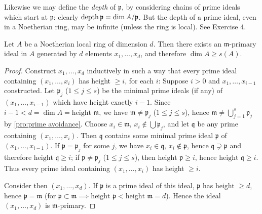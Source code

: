 \begin{remark}
Likewise we may define the \emph{depth} of $\mathfrak{p}$, by considering chains of prime ideals which start at $\mathfrak{p}$: clearly $\operatorname{depth} \mathfrak{p} = \dim A/\mathfrak{p}$. But the depth of a prime ideal, even in a Noetherian ring, may be infinite (unless the ring is local). See Exercise 4.
\end{remark}

\begin{proposition}\label{prop:dim-leq-s}
Let $A$ be a Noetherian local ring of dimension $d$. Then there exists an $\mathfrak{m}$-primary ideal in $A$ generated by $d$ elements $x_1, \ldots, x_d$, and therefore $\dim A \geq s(A)$.
\end{proposition}

\begin{proof}
Construct $x_1, \ldots, x_d$ inductively in such a way that every prime ideal containing $(x_1, \ldots, x_i)$ has height $\geq i$, for each $i$: Suppose $i > 0$ and $x_1, \ldots, x_{i-1}$ constructed. Let $\mathfrak{p}_j$ ($1 \leq j \leq s$) be the minimal prime ideals (if any) of $(x_1, \ldots, x_{i-1})$ which have height exactly $i - 1$. Since $i - 1 < d = \dim A = \text{height } \mathfrak{m}$, we have $\mathfrak{m} \neq \mathfrak{p}_j$ ($1 \leq j \leq s$), hence $\mathfrak{m} \neq \bigcup_{j=1}^s \mathfrak{p}_j$ by \eqref{pro:prime avoidance}. Choose $x_i \in \mathfrak{m}$, $x_i \notin \bigcup \mathfrak{p}_j$, and let $\mathfrak{q}$ be any prime containing $(x_1, \ldots, x_i)$. Then $\mathfrak{q}$ contains some minimal prime ideal $\mathfrak{p}$ of $(x_1, \ldots, x_{i-1})$. If $\mathfrak{p} = \mathfrak{p}_j$ for some $j$, we have $x_i \in \mathfrak{q}$, $x_i \notin \mathfrak{p}$, hence $\mathfrak{q} \supsetneq \mathfrak{p}$ and therefore $\text{height } \mathfrak{q} \geq i$; if $\mathfrak{p} \neq \mathfrak{p}_j$ ($1 \leq j \leq s$), then $\text{height } \mathfrak{p} \geq i$, hence $\text{height } \mathfrak{q} \geq i$. Thus every prime ideal containing $(x_1, \ldots, x_i)$ has height $\geq i$.

Consider then $(x_1, \ldots, x_d)$. If $\mathfrak{p}$ is a prime ideal of this ideal, $\mathfrak{p}$ has height $\geq d$, hence $\mathfrak{p} = \mathfrak{m}$ (for $\mathfrak{p} \subset \mathfrak{m} \implies \text{height } \mathfrak{p} < \text{height } \mathfrak{m} = d$). Hence the ideal $(x_1, \ldots, x_d)$ is $\mathfrak{m}$-primary.
\end{proof}

